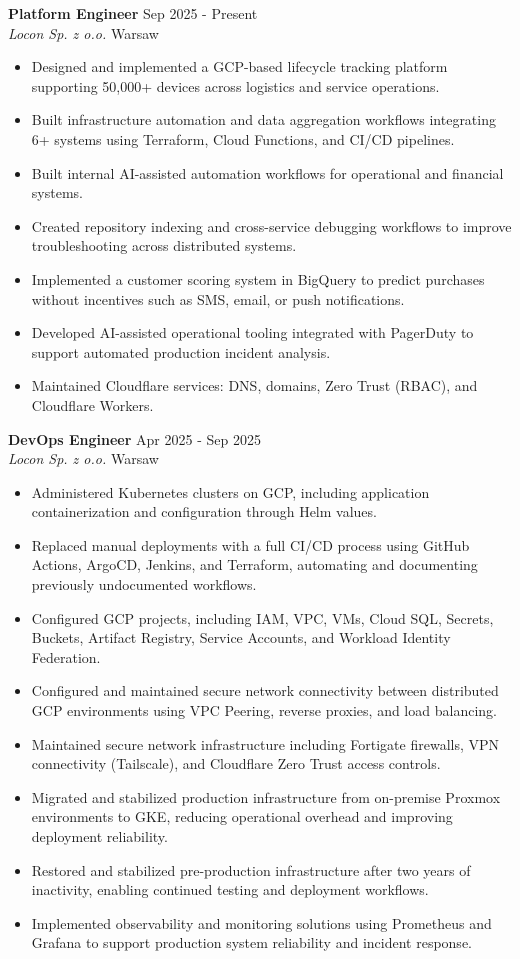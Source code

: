 \documentclass[11pt,a4paper]{article}
\newcommand{\entry}[4]{%
	\noindent\textbf{\color{darktext}#1} \hfill {\small #2} \\
	\textit{#3} \hfill {\small #4}%
}
\begin{document}
	\entry{Platform Engineer}{Sep 2025 - Present}{Locon Sp. z o.o.}{Warsaw}
	\begin{itemize}[leftmargin=1.5em, itemsep=0.1em, topsep=0.2em]
		\item Designed and implemented a GCP-based lifecycle tracking platform supporting 50,000+ devices across logistics and service operations.
		\item Built infrastructure automation and data aggregation workflows integrating 6+ systems using Terraform, Cloud Functions, and CI/CD pipelines.
		\item Built internal AI-assisted automation workflows for operational and financial systems.
		\item Created repository indexing and cross-service debugging workflows to improve troubleshooting across distributed systems.
		\item Implemented a customer scoring system in BigQuery to predict purchases without incentives such as SMS, email, or push notifications.
		\item Developed AI-assisted operational tooling integrated with PagerDuty to support automated production incident analysis.
		\item Maintained Cloudflare services: DNS, domains, Zero Trust (RBAC), and Cloudflare Workers.
	\end{itemize}
	
	\vspace{0.3em}
	
	\entry{DevOps Engineer}{Apr 2025 - Sep 2025}{Locon Sp. z o.o.}{Warsaw}
	\begin{itemize}[leftmargin=1.5em, itemsep=0.1em, topsep=0.2em]
		\item Administered Kubernetes clusters on GCP, including application containerization and configuration through Helm values.
		\item Replaced manual deployments with a full CI/CD process using GitHub Actions, ArgoCD, Jenkins, and Terraform, automating and documenting previously undocumented workflows.
		\item Configured GCP projects, including IAM, VPC, VMs, Cloud SQL, Secrets, Buckets, Artifact Registry, Service Accounts, and Workload Identity Federation.
		\item Configured and maintained secure network connectivity between distributed GCP environments using VPC Peering, reverse proxies, and load balancing.
		\item Maintained secure network infrastructure including Fortigate firewalls, VPN connectivity (Tailscale), and Cloudflare Zero Trust access controls.
		\item Migrated and stabilized production infrastructure from on-premise Proxmox environments to GKE, reducing operational overhead and improving deployment reliability.
		\item Restored and stabilized pre-production infrastructure after two years of inactivity, enabling continued testing and deployment workflows.
		\item Implemented observability and monitoring solutions using Prometheus and Grafana to support production system reliability and incident response.
	\end{itemize}
	
\end{document}
